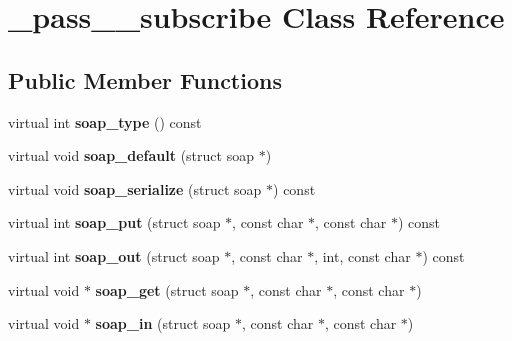 \hypertarget{class__pass____subscribe}{
\section{\_\-pass\_\-\_\-subscribe Class Reference}
\label{class__pass____subscribe}
}
\subsection*{Public Member Functions}
\begin{DoxyCompactItemize}
\item 
\hypertarget{class__pass____subscribe_afcca96d503d816ba1765fecc0fdb7820}{
virtual int {\bfseries soap\_\-type} () const }
\label{class__pass____subscribe_afcca96d503d816ba1765fecc0fdb7820}

\item 
\hypertarget{class__pass____subscribe_a931003a6c1a5cb42981e09582ff5de39}{
virtual void {\bfseries soap\_\-default} (struct soap $\ast$)}
\label{class__pass____subscribe_a931003a6c1a5cb42981e09582ff5de39}

\item 
\hypertarget{class__pass____subscribe_ac67873fabcd90352d509118f9c1f3943}{
virtual void {\bfseries soap\_\-serialize} (struct soap $\ast$) const }
\label{class__pass____subscribe_ac67873fabcd90352d509118f9c1f3943}

\item 
\hypertarget{class__pass____subscribe_a1b495d294092de490387c0652bf96465}{
virtual int {\bfseries soap\_\-put} (struct soap $\ast$, const char $\ast$, const char $\ast$) const }
\label{class__pass____subscribe_a1b495d294092de490387c0652bf96465}

\item 
\hypertarget{class__pass____subscribe_a8b56b2626966d7e86a96b37f849fa966}{
virtual int {\bfseries soap\_\-out} (struct soap $\ast$, const char $\ast$, int, const char $\ast$) const }
\label{class__pass____subscribe_a8b56b2626966d7e86a96b37f849fa966}

\item 
\hypertarget{class__pass____subscribe_a9123196f95cc3ee4bfc271f63f62e105}{
virtual void $\ast$ {\bfseries soap\_\-get} (struct soap $\ast$, const char $\ast$, const char $\ast$)}
\label{class__pass____subscribe_a9123196f95cc3ee4bfc271f63f62e105}

\item 
\hypertarget{class__pass____subscribe_a9da8d49c3d4d02e0d738cf6b01a428dc}{
virtual void $\ast$ {\bfseries soap\_\-in} (struct soap $\ast$, const char $\ast$, const char $\ast$)}
\label{class__pass____subscribe_a9da8d49c3d4d02e0d738cf6b01a428dc}

\end{DoxyCompactItemize}
